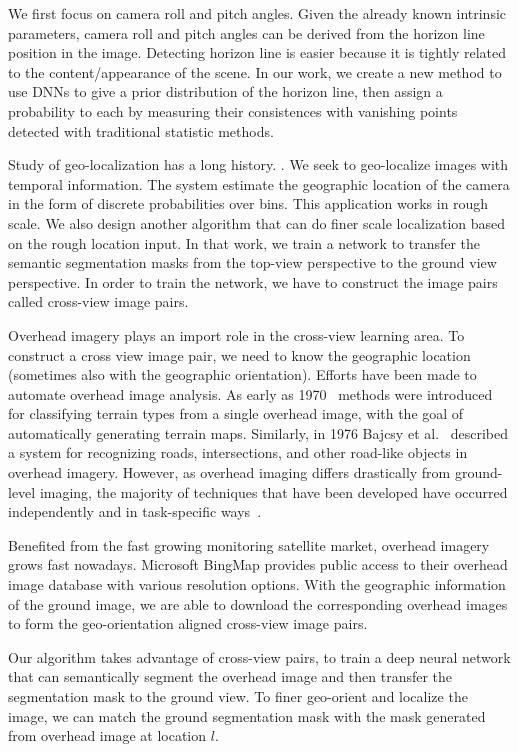 We first focus on camera roll and pitch angles. Given the already
known intrinsic parameters, camera roll and pitch angles can be
derived from the horizon line position in the image. Detecting horizon
line is easier because it is tightly related to the content/appearance
of the scene. In our work, we create a new method to use DNNs to give
a prior distribution of the horizon line, then assign a probability to
each by measuring their consistences with vanishing points detected
with traditional statistic methods.

Study of geo-localization has a long history. . We
seek to geo-localize images with temporal information. The system
estimate the geographic location of the camera in the form of discrete
probabilities over bins. This application works in rough scale. We
also design another algorithm that can do finer scale localization
based on the rough location input. In that work, we train a network to
transfer the semantic segmentation masks from the top-view perspective
to the ground view perspective. In order to train the network, we have
to construct the image pairs called cross-view image pairs.

Overhead imagery plays an import role in the cross-view learning area.
To construct a cross view image pair, we need to know the geographic
location (sometimes also with the geographic orientation).
 Efforts have been made to
automate overhead image analysis. As early as
1970~\cite{idelsohn1970learning} methods were introduced for
classifying terrain types from a single overhead image, with the goal
of automatically generating terrain maps.  Similarly, in 1976 Bajcsy
et al.~\cite{bajcsy1976computer} described a system for recognizing
roads, intersections, and other road-like objects in overhead imagery.
However, as overhead imaging differs drastically from ground-level
imaging, the majority of techniques that have been developed have
occurred independently and in task-specific ways~\cite{Rozen}.

Benefited from the fast growing monitoring satellite market, overhead
imagery grows fast nowadays. Microsoft BingMap provides public access
to their overhead image database with various resolution options. With
the geographic information of the ground image, we are able to
download the corresponding overhead images to form the geo-orientation
aligned cross-view image pairs.

Our algorithm takes advantage of cross-view pairs, to train a deep
neural network that can semantically segment the overhead image and
then transfer the segmentation mask to the ground view. To finer
geo-orient and localize the image, we can match the ground
segmentation mask with the mask generated from overhead image at
location $l$.


